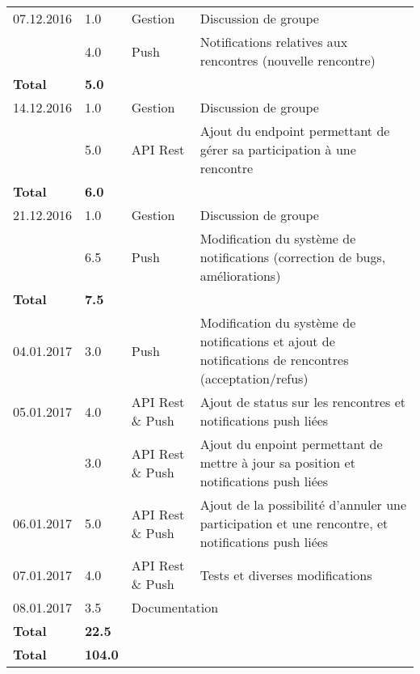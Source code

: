 \documentclass[french]{article}
\begin{document}
\begin{longtable}{p{}|p{}|p{}|p{}}
		\hline
		07.12.2016 & 1.0 & Gestion & Discussion de groupe \\
				   & 4.0 & Push & Notifications relatives aux rencontres (nouvelle rencontre) \\
		\textbf{Total} & \textbf{5.0} && \\

		\hline
		14.12.2016 & 1.0 & Gestion & Discussion de groupe \\
				   & 5.0 & API Rest & Ajout du endpoint permettant de gérer sa participation à une rencontre \\
		\textbf{Total} & \textbf{6.0} && \\

		\hline
		21.12.2016 & 1.0 & Gestion & Discussion de groupe \\
				   & 6.5 & Push & Modification du système de notifications (correction de bugs, améliorations) \\
	   \textbf{Total} & \textbf{7.5} && \\

		\hline
		04.01.2017 & 3.0 & Push & Modification du système de notifications et ajout de notifications de rencontres (acceptation/refus) \\
		05.01.2017 & 4.0 & API Rest \& Push & Ajout de status sur les rencontres et notifications push liées \\
				   & 3.0 & API Rest \& Push & Ajout du enpoint permettant de mettre à jour sa position et notifications push liées \\
		06.01.2017 & 5.0 & API Rest \& Push & Ajout de la possibilité d'annuler une participation et une rencontre, et notifications push liées \\
		07.01.2017 & 4.0 & API Rest \& Push & Tests et diverses modifications \\
		08.01.2017 & 3.5 & \multicolumn{2}{l}{Documentation} \\
		\textbf{Total} & \textbf{22.5} && \\

		\hline
		\hline

		\textbf{Total} & \textbf{104.0} && \\
		
		\hline
	\end{longtable}
	
\end{document}
